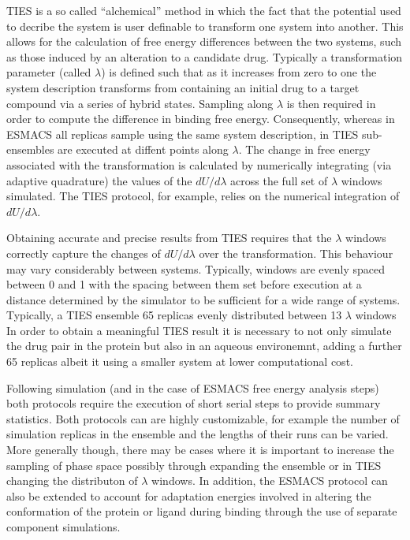 TIES is a so called ``alchemical'' method in which the fact that the potential used to decribe the system is user definable to transform one
system into another.
This allows for the calculation of free energy differences between the two
systems, such as those induced by an alteration to a candidate drug.
Typically a transformation parameter (called $\lambda$) is defined such that as it increases from zero to one the system description transforms from containing an
initial drug to a target compound via a series of hybrid states.
Sampling along $\lambda$ is then required in order to compute the difference in binding free energy.
Consequently, whereas in ESMACS all replicas sample using the same system description,
in TIES sub-ensembles are executed at diffent points along $\lambda$.
The change in free energy associated with the transformation is calculated by numerically integrating (via adaptive quadrature) the
values of the $dU/d\lambda$ across the full set of $\lambda$ windows simulated.
The TIES protocol, for example, relies on the numerical
integration of $dU/d\lambda$. 

Obtaining accurate and precise results from TIES requires that the $\lambda$ windows correctly
capture the changes of $dU/d\lambda$ over the transformation.
This behaviour may vary considerably between systems.
Typically, windows are evenly spaced between 0 and 1 with the spacing between them set before
execution at a distance determined by the simulator to be sufficient for a wide range of systems.
Typically, a TIES ensemble 65 replicas evenly distributed between 13 $\lambda$ windows
In order to obtain a meaningful TIES result it is necessary to not only simulate the drug pair
in the protein but also in an aqueous environemnt, adding a further 65 replicas albeit it using a
smaller system at lower computational cost.

Following simulation (and in the case of ESMACS free energy analysis steps) both protocols require
the execution of short serial steps to provide summary statistics.
Both protocols can are highly customizable, for example the number of simulation replicas in the
ensemble and the lengths of their runs can be varied.
More generally though, there may be cases where it is important to increase the sampling of phase
space possibly through expanding the ensemble or in TIES changing the distributon of $\lambda$
windows.
In addition, the ESMACS protocol can also be extended to account for adaptation energies involved
in altering the conformation of the protein or ligand during binding through the use of separate
component simulations.

